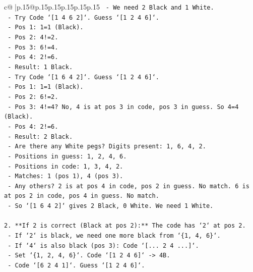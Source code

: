 \documentclass{article}
\begin{document}
{\begin{supertabular}{c@{$\;$}|p{.15\linewidth}@{}p{.15\linewidth}p{.15\linewidth}p{.15\linewidth}p{.15\linewidth}p{.15\linewidth}}
{{{\texttt{        {-}   We need 2 Black and 1 White.} \\
\texttt{        {-}   Try Code `{[}1 4 6 2{]}`. Guess `{[}1 2 4 6{]}`.} \\
\texttt{            {-}   Pos 1: 1=1 (Black).} \\
\texttt{            {-}   Pos 2: 4!=2.} \\
\texttt{            {-}   Pos 3: 6!=4.} \\
\texttt{            {-}   Pos 4: 2!=6.} \\
\texttt{            {-}   Result: 1 Black.} \\
\texttt{        {-}   Try Code `{[}1 6 4 2{]}`. Guess `{[}1 2 4 6{]}`.} \\
\texttt{            {-}   Pos 1: 1=1 (Black).} \\
\texttt{            {-}   Pos 2: 6!=2.} \\
\texttt{            {-}   Pos 3: 4!=4? No, 4 is at pos 3 in code, pos 3 in guess. So 4=4 (Black).} \\
\texttt{            {-}   Pos 4: 2!=6.} \\
\texttt{            {-}   Result: 2 Black.} \\
\texttt{            {-}   Are there any White pegs? Digits present: 1, 6, 4, 2.} \\
\texttt{            {-}   Positions in guess: 1, 2, 4, 6.} \\
\texttt{            {-}   Positions in code: 1, 3, 4, 2.} \\
\texttt{            {-}   Matches: 1 (pos 1), 4 (pos 3).} \\
\texttt{            {-}   Any others? 2 is at pos 4 in code, pos 2 in guess. No match. 6 is at pos 2 in code, pos 4 in guess. No match.} \\
\texttt{            {-}   So `{[}1 6 4 2{]}` gives 2 Black, 0 White. We need 1 White.} \\
\\ 
\texttt{2.  **If 2 is correct (Black at pos 2):** The code has `2` at pos 2.} \\
\texttt{    {-}   If `2` is black, we need one more black from `\{1, 4, 6\}`.} \\
\texttt{    {-}   If `4` is also black (pos 3): Code `{[}... 2 4 ...{]}`.} \\
\texttt{        {-}   Set `\{1, 2, 4, 6\}`. Code `{[}1 2 4 6{]}` {-}> 4B.} \\
\texttt{        {-}   Code `{[}6 2 4 1{]}`. Guess `{[}1 2 4 6{]}`.} \\
}}}
\end{supertabular}}
\end{document}
